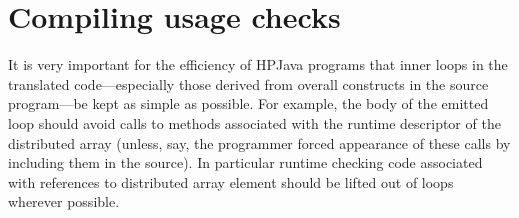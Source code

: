 \documentclass{article}
\begin{document}

\section{Compiling usage checks\label{sec:compiling}}

It is very important for the efficiency of HPJava programs that inner loops
in the translated code---especially those derived from overall
constructs in the source program---be kept as simple as possible.  For
example, the body of the emitted loop should avoid calls to methods
associated with the runtime descriptor of the distributed array
(unless, say, the programmer forced appearance of these calls by
including them in the source).  In particular runtime checking
code associated with references to distributed array element should be
lifted out of loops wherever possible.
\end{document}
